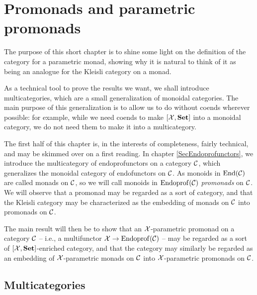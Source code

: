 \chapter{Promonads and parametric promonads}
\label{ChapPromonads}

The purpose of this short chapter is to shine some light on the definition of the \Mellies category for a parametric monad, showing why it is natural to think of it as being an analogue for the Kleisli category on a monad.

As a technical tool to prove the results we want, we shall introduce multicategories, which are a small generalization of monoidal categories.  
The main purpose of this generalization is to allow us to do without coends wherever possible: for example, while we need coends to make $[\mathcal X,{\normalfont\textbf{Set}}]$ into a monoidal category, we do not need them to make it into a multicategory.  

The first half of this chapter is, in the interests of completeness, fairly technical, and may be skimmed over on a first reading.  
In chapter \ref{SecEndoprofunctors}, we introduce the multicategory of endoprofunctors on a category ${\mathcal{C}}$, which generalizes the monoidal category of endofunctors on ${\mathcal{C}}$.  
As monoids in $\operatorname{End}({\mathcal{C}})$ are called monads on ${\mathcal{C}}$, so we will call monoids in $\operatorname{Endoprof}({\mathcal{C}})$ \emph{promonads} on ${\mathcal{C}}$.  
We will observe that a promonad may be regarded as a sort of category, and that the Kleisli category may be characterized as the embedding of monads on ${\mathcal{C}}$ into promonads on ${\mathcal{C}}$.  

The main result will then be to show that an $\mathcal X$-parametric promonad on a category ${\mathcal{C}}$ -- i.e., a multifunctor $\mathcal X \to \operatorname{Endoprof}({\mathcal{C}})$ -- may be regarded as a sort of $[\mathcal X,{\normalfont\textbf{Set}}]$-enriched category, and that the \Mellies category may similarly be regarded as an embedding of $\mathcal X$-parametric monads on ${\mathcal{C}}$ into $\mathcal X$-parametric promonads on ${\mathcal{C}}$.

\section{Multicategories}

